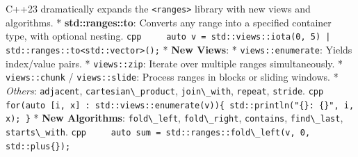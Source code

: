 C++23 dramatically expands the \passthrough{\lstinline!<ranges>!}
library with new views and algorithms. * \textbf{std::ranges::to}:
Converts any range into a specified container type, with optional
nesting.
\passthrough{\lstinline!cpp     auto v = std::views::iota(0, 5) | std::ranges::to<std::vector>();!}
* \textbf{New Views}: * \passthrough{\lstinline!views::enumerate!}:
Yields index/value pairs. * \passthrough{\lstinline!views::zip!}:
Iterate over multiple ranges simultaneously. *
\passthrough{\lstinline!views::chunk!} /
\passthrough{\lstinline!views::slide!}: Process ranges in blocks or
sliding windows. * \emph{Others}: \passthrough{\lstinline!adjacent!},
\passthrough{\lstinline!cartesian\_product!},
\passthrough{\lstinline!join\_with!}, \passthrough{\lstinline!repeat!},
\passthrough{\lstinline!stride!}.
\passthrough{\lstinline!cpp     for(auto [i, x] : std::views::enumerate(v))\{ std::println("\{\}: \{\}", i, x); \}!}
* \textbf{New Algorithms}: \passthrough{\lstinline!fold\_left!},
\passthrough{\lstinline!fold\_right!},
\passthrough{\lstinline!contains!},
\passthrough{\lstinline!find\_last!},
\passthrough{\lstinline!starts\_with!}.
\passthrough{\lstinline!cpp     auto sum = std::ranges::fold\_left(v, 0, std::plus\{\});!}
